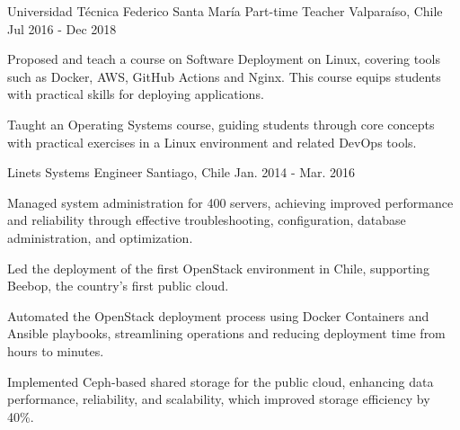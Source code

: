 \begin{cventries}
    \cventry
    {Universidad Técnica Federico Santa María}
    {Part-time Teacher}
    {Valparaíso, Chile}
    {Jul 2016 - Dec 2018}
    {
      \begin{cvitems}
        \item{Proposed and teach a course on Software Deployment on Linux, covering tools such as Docker, AWS, GitHub Actions and Nginx. This course equips students with practical skills for deploying applications.}
        \item{Taught an Operating Systems course, guiding students through core concepts with practical exercises in a Linux environment and related DevOps tools.}
      \end{cvitems}
    }


  \cventry
    {Linets}
    {Systems Engineer}
    {Santiago, Chile}
    {Jan. 2014 - Mar. 2016}
    {
      \begin{cvitems}
        \item{Managed system administration for 400 servers, achieving improved performance and reliability through effective troubleshooting, configuration, database administration, and optimization.}
        \item{Led the deployment of the first OpenStack environment in Chile, supporting Beebop, the country's first public cloud.}
        \item{Automated the OpenStack deployment process using Docker Containers and Ansible playbooks, streamlining operations and reducing deployment time from hours to minutes.}
        \item{Implemented Ceph-based shared storage for the public cloud, enhancing data performance, reliability, and scalability, which improved storage efficiency by 40\%.}
      \end{cvitems}
    }

\end{cventries}
